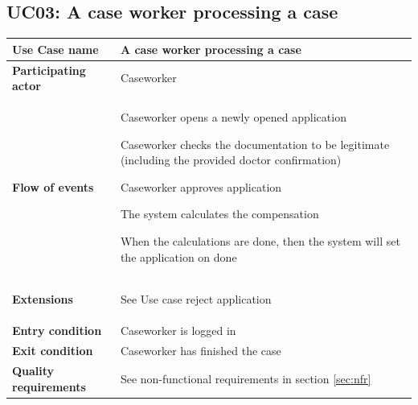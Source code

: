 \subsection{UC03: A case worker processing a case}
\begin{table}[htb!]
\begin{tabularx}{\textwidth}{l|X}
	\textbf{Use Case name} & A case worker processing a case \\
	\hline
	\textbf{Participating actor} & Caseworker\\
	\hline
	\textbf{Flow of events} &
	\vspace{-2mm}
	    \begin{compactenum}
	        \item Caseworker opens a newly opened application
	        \item Caseworker checks the documentation to be legitimate (including the provided doctor confirmation)
	        \item Caseworker approves application
	        \item The system calculates the compensation
	        \item When the calculations are done, then the system will set the application on done
	    \end{compactenum}\\
	\hline
	\textbf{Extensions} & 
	    \vspace{-2mm}
	    \begin{compactenum}
	        \setcounter{enumi}{2}
	        \item See Use case reject application
	    \end{compactenum}\\
	\hline
	\textbf{Entry condition} & Caseworker is logged in\\
	\hline
	\textbf{Exit condition} & Caseworker has finished the case\\
	\hline
	\textbf{Quality requirements} & See non-functional requirements in section \ref{sec:nfr}\\
\end{tabularx}
\end{table}